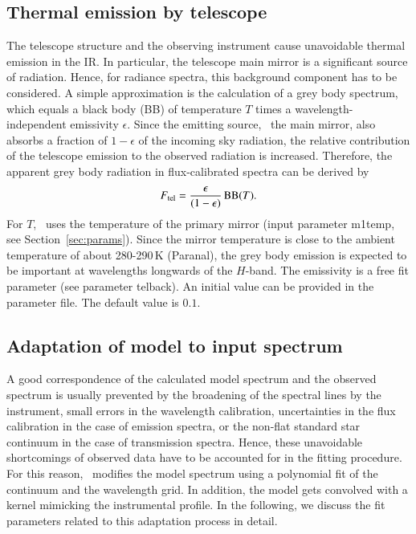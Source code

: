 \subsection{Thermal emission by telescope}\label{sec:greybody}
The telescope structure and the observing instrument cause unavoidable thermal
emission in the IR. In particular, the telescope main mirror is a significant
source of radiation. Hence, for radiance spectra, this background component has
to be considered. A simple approximation is the calculation of a grey body
spectrum, which equals a black body (BB) of temperature $T$ times a
wavelength-independent emissivity $\epsilon$. Since the emitting source, \ie\
the main mirror, also absorbs a fraction of $1 - \epsilon$ of the incoming
sky radiation, the relative contribution of the telescope emission to the
observed radiation is increased. Therefore, the apparent grey body radiation
in flux-calibrated spectra can be derived by
\begin{equation}
F_{\rm tel} = \frac{\epsilon}{(1 - \epsilon)} \,{\rm BB}(T).
\end{equation}
For $T$, \mf\ uses the temperature of the primary mirror (input parameter
{\sc m1temp}, see Section~\ref{sec:params}). Since the mirror temperature
is close to the ambient temperature of about 280-290\,K (Paranal), the grey
body emission is expected to be important at wavelengths longwards of the
$H$-band. The emissivity is a free fit parameter (see parameter {\sc telback}).
An initial value can be provided in the parameter file. The default value is
$0.1$.

\subsection{Adaptation of model to input spectrum}\label{sec:adaption}
A good correspondence of the calculated model spectrum and the observed
spectrum is usually prevented by the broadening of the spectral lines by the
instrument, small errors in the wavelength calibration, uncertainties in the
flux calibration in the case of emission spectra, or the non-flat standard star
continuum in the case of transmission spectra. Hence, these unavoidable
shortcomings of observed data have to be accounted for in the fitting
procedure. For this reason, \mf\ modifies the model spectrum using a
polynomial fit of the continuum and the wavelength grid. In addition, the model
gets convolved with a kernel mimicking the instrumental profile. In the
following, we discuss the fit parameters related to this adaptation process in
detail.

